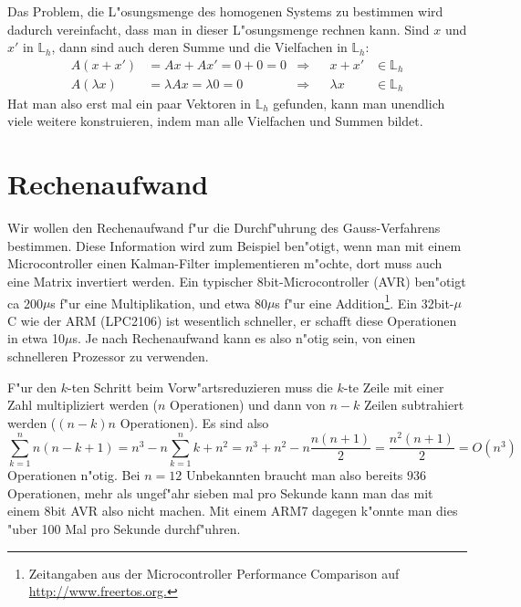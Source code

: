 Das Problem, die L"osungsmenge des homogenen Systems zu bestimmen wird
dadurch vereinfacht, dass man in dieser L"osungsmenge rechnen kann. 
Sind $x$ und $x'$  in $\mathbb L_h$, dann sind auch deren Summe und
die Vielfachen in $\mathbb L_h$:
\begin{align*}
A(x+x')&=Ax+Ax'=0+0=0&\Rightarrow&&x+x'&\in\mathbb L_h\\
A(\lambda x)&=\lambda Ax=\lambda 0=0&\Rightarrow&&\lambda x&\in \mathbb L_h
\end{align*}
Hat man also erst mal ein paar Vektoren in $\mathbb L_h$ gefunden, kann
man unendlich viele weitere konstruieren, indem man alle Vielfachen und Summen
bildet.

\section{Rechenaufwand}
Wir wollen den Rechenaufwand f"ur die Durchf"uhrung des Gauss-Verfahrens
bestimmen. Diese Information wird zum Beispiel ben"otigt, wenn man mit
einem Microcontroller einen Kalman-Filter implementieren m"ochte, dort
muss auch eine Matrix invertiert werden.
Ein typischer 8bit-Microcontroller (AVR)
ben"otigt ca 200$\mu$s f"ur eine Multiplikation, und etwa 80$\mu$s f"ur
eine Addition\footnote{Zeitangaben aus der Microcontroller Performance
Comparison auf \url {http://www.freertos.org.}}.
Ein 32bit-$\mu$C wie der ARM (LPC2106) ist wesentlich schneller,
er schafft diese Operationen in etwa 10$\mu$s. Je nach Rechenaufwand kann
es also n"otig sein, von einen schnelleren Prozessor zu verwenden. 

F"ur den $k$-ten Schritt beim Vorw"artsreduzieren muss die $k$-te
Zeile mit einer Zahl multipliziert werden ($n$ Operationen) und dann
von $n-k$ Zeilen subtrahiert werden ($(n-k)n$ Operationen). Es sind also
$$
\sum_{k=1}^n n(n-k+1) = n^3 - n \sum_{k=1}^n k + n^2
=n^3+n^2-n\frac{n(n+1)}2=\frac{n^2(n+1)}2 =O(n^3)
$$
Operationen n"otig. Bei $n=12$ Unbekannten braucht man also bereits
$936$ Operationen, mehr als ungef"ahr sieben mal pro Sekunde kann man das mit
einem 8bit AVR also nicht machen. Mit einem ARM7 dagegen k"onnte
man dies "uber 100 Mal pro Sekunde durchf"uhren.

